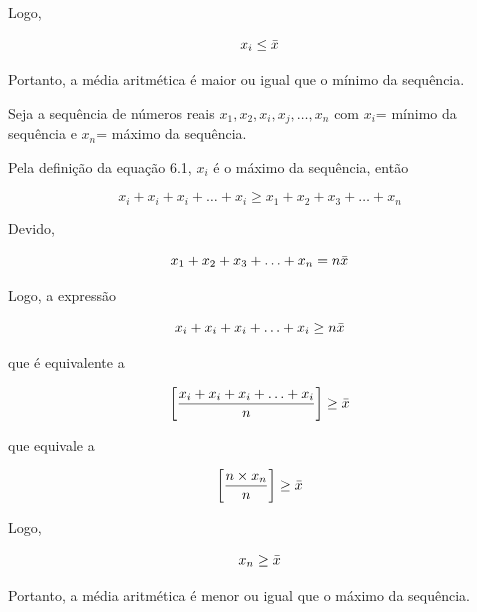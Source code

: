 \begin{enumerate}
Logo,

\begin{equation*}\label{propriedade1}
x_{i} \leq \Bar{x}
\end{equation*}

Portanto, a média aritmética é maior ou igual que o mínimo da sequência.



\vskip0.3cm

\textbf{}
\vskip0.3cm

Seja a sequência de números reais $x_{1},x_{2},x_{i},x_{j},\ldots,x_{n}$ com $x_{i}$= mínimo da sequência e $x_{n}$= máximo da sequência. \vskip0.3cm

Pela definição da equação 6.1, $x_{i}$ é o máximo da sequência, então 

\begin{equation*}\label{propriedade1}
x_{i}+x_{i}+x_{i}+\ldots+x_{i} \geq  x_{1}+x_{2}+x_{3}+\ldots+x_{n}
\end{equation*}

Devido,

\begin{equation*}\label{propriedade1}
x_{1}+x_{2}+x_{3}+\ldots+x_{n}=n \Bar{x}
\end{equation*}

Logo, a expressão

\begin{equation*}\label{propriedade1}
x_{i}+x_{i}+x_{i}+\ldots+x_{i} \geq n \Bar{x}
\end{equation*}

que é equivalente a 

\begin{equation*}\label{propriedade1}
\left[ \frac{x_{i}+x_{i}+x_{i}+\ldots+x_{i}}{n} \right ] \geq \Bar{x}
\end{equation*}

que equivale a 

\begin{equation*}\label{propriedade1}
\left[ \frac{n \times x_{n}}{n} \right ] \geq \Bar{x}
\end{equation*}

Logo,

\begin{equation*}\label{propriedade1}
x_{n} \geq \Bar{x}
\end{equation*}

Portanto, a média aritmética é menor ou igual que o máximo da sequência.




\end{enumerate}
